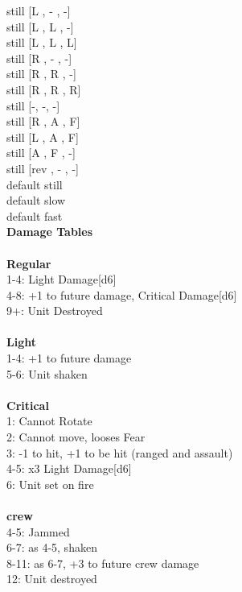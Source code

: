 still [L ,  - ,  -] \\
still [L ,  L ,  -] \\
still [L ,  L ,  L] \\
still [R ,  - ,  -] \\
still [R ,  R ,  -] \\
still [R ,  R ,  R] \\
still [-, -, -] \\
still [R ,  A ,  F] \\
still [L ,  A ,  F] \\
still [A ,  F ,  -] \\
still [rev ,  - ,  -] \\
default still \\
default slow \\
default fast \\


{\bf Damage Tables} \\
\ \\ {\bf Regular } \\
1-4: Light Damage[d6] \\
4-8: +1 to future damage, Critical Damage[d6] \\
9+: Unit Destroyed \\
\ \\ {\bf Light } \\
1-4: +1 to future damage \\
5-6: Unit shaken \\
\ \\ {\bf Critical } \\
1: Cannot Rotate \\
2: Cannot move, looses Fear \\
3: -1 to hit, +1 to be hit (ranged and assault) \\
4-5: x3 Light Damage[d6] \\
6: Unit set on fire \\
\ \\ {\bf crew } \\
4-5: Jammed \\
6-7: as 4-5, shaken \\
8-11: as 6-7, +3 to future crew damage \\
12: Unit destroyed \\










